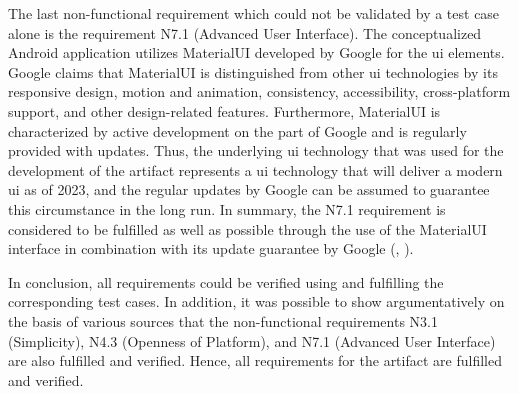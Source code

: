 The last non-functional requirement which could not be validated by a test case alone is the requirement N7.1 (Advanced User Interface). The conceptualized Android application utilizes MaterialUI developed by Google for the \ac{ui} elements. Google claims that MaterialUI is distinguished from other \ac{ui} technologies by its responsive design, motion and animation, consistency, accessibility, cross-platform support, and other design-related features. Furthermore, MaterialUI is characterized by active development on the part of Google and is regularly provided with updates. Thus, the underlying \ac{ui} technology that was used for the development of the artifact represents a \ac{ui} technology that will deliver a modern \ac{ui} as of 2023, and the regular updates by Google can be assumed to guarantee this circumstance in the long run. In summary, the N7.1 requirement is considered to be fulfilled as well as possible through the use of the MaterialUI interface in combination with its update guarantee by Google (\cite{Google.2023c}, \cite{Google.2023}). 

In conclusion, all requirements could be verified using and fulfilling the corresponding test cases. In addition, it was possible to show argumentatively on the basis of various sources that the non-functional requirements N3.1 (Simplicity), N4.3 (Openness of Platform), and N7.1 (Advanced User Interface) are also fulfilled and verified. Hence, all requirements for the artifact are fulfilled and verified.


